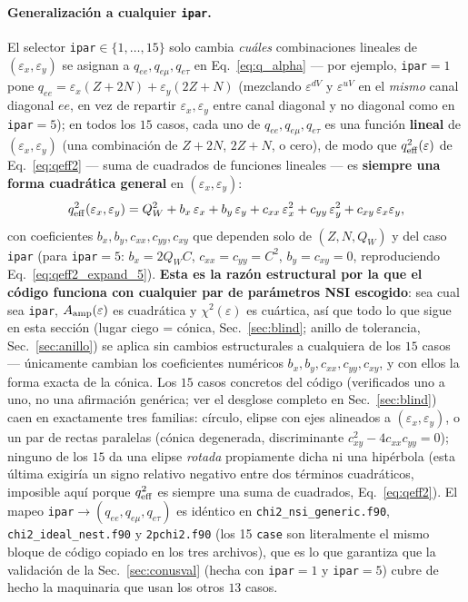 \documentclass[11pt,a4paper]{article}
\newcommand{\eps}{\varepsilon}
\newcommand{\QW}{Q_{W}}
\newcommand{\qeff}{q_{\rm eff}}
\newcommand{\Aamp}{A_{\rm amp}}
\newcommand{\code}[1]{\texttt{#1}}
\begin{document}
\paragraph{Generalizaci\'on a cualquier \code{ipar}.} El selector
\code{ipar}$\in\{1,\ldots,15\}$ solo cambia \emph{cu\'ales} combinaciones lineales
de $(\eps_{x},\eps_{y})$ se asignan a $q_{ee},q_{e\mu},q_{e\tau}$ en
Eq.~\eqref{eq:q_alpha} --- por ejemplo, \code{ipar}$=1$ pone
$q_{ee}=\eps_{x}(Z+2N)+\eps_{y}(2Z+N)$ (mezclando $\eps^{dV}$ y $\eps^{uV}$ en el
\emph{mismo} canal diagonal $ee$, en vez de repartir $\eps_x,\eps_y$ entre canal
diagonal y no diagonal como en \code{ipar}$=5$); en todos los $15$ casos, cada
uno de $q_{ee},q_{e\mu},q_{e\tau}$ es una funci\'on \textbf{lineal} de
$(\eps_{x},\eps_{y})$ (una combinaci\'on de $Z+2N$, $2Z+N$, o cero), de modo que
$\qeff^{2}(\eps)$ de Eq.~\eqref{eq:qeff2} --- suma de cuadrados de funciones
lineales --- es \textbf{siempre una forma cuadr\'atica general} en
$(\eps_{x},\eps_{y})$:
\begin{equation}
  \label{eq:qeff2_general_quad}
  \qeff^{2}(\eps_{x},\eps_{y})
  = \QW^{2} + b_{x}\,\eps_{x} + b_{y}\,\eps_{y}
    + c_{xx}\,\eps_{x}^{2} + c_{yy}\,\eps_{y}^{2} + c_{xy}\,\eps_{x}\eps_{y},
\end{equation}
con coeficientes $b_{x},b_{y},c_{xx},c_{yy},c_{xy}$ que dependen solo de
$(Z,N,\QW)$ y del caso \code{ipar} (para \code{ipar}$=5$: $b_x=2\QW C$,
$c_{xx}=c_{yy}=C^2$, $b_y=c_{xy}=0$, reproduciendo Eq.~\eqref{eq:qeff2_expand_5}).
\textbf{Esta es la raz\'on estructural por la que el c\'odigo funciona con
cualquier par de par\'ametros NSI escogido}: sea cual sea \code{ipar}, $\Aamp(\eps)$
es cuadr\'atica y $\chi^{2}(\eps)$ es cu\'artica, as\'i que todo lo que sigue en
esta secci\'on (lugar ciego = c\'onica, Sec.~\ref{sec:blind}; anillo de tolerancia,
Sec.~\ref{sec:anillo}) se aplica sin cambios estructurales a cualquiera de los
$15$ casos --- \'unicamente cambian los coeficientes num\'ericos $b_x,b_y,c_{xx},
c_{yy},c_{xy}$, y con ellos la forma exacta de la c\'onica. Los $15$ casos
concretos del c\'odigo (verificados uno a uno, no una afirmaci\'on gen\'erica; ver
el desglose completo en Sec.~\ref{sec:blind}) caen en exactamente tres familias:
c\'irculo, elipse con ejes alineados a $(\eps_x,\eps_y)$, o un par de rectas
paralelas (c\'onica degenerada, discriminante $c_{xy}^2-4c_{xx}c_{yy}=0$); ninguno
de los $15$ da una elipse \emph{rotada} propiamente dicha ni una hip\'erbola (esta
\'ultima exigir\'ia un signo relativo negativo entre dos t\'erminos cuadr\'aticos,
imposible aqu\'i porque $\qeff^{2}$ es siempre una suma de cuadrados,
Eq.~\eqref{eq:qeff2}).
El mapeo \code{ipar}$\to(q_{ee},q_{e\mu},q_{e\tau})$ es id\'entico en
\code{chi2\_nsi\_generic.f90}, \code{chi2\_ideal\_nest.f90} y \code{2pchi2.f90} (los
15 \code{case} son literalmente el mismo bloque de c\'odigo copiado en los tres
archivos), que es lo que garantiza que la validaci\'on de la
Sec.~\ref{sec:conusval} (hecha con \code{ipar}$=1$ y \code{ipar}$=5$) cubre de
hecho la maquinaria que usan los otros $13$ casos.
\end{document}
